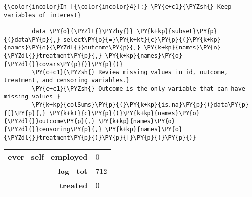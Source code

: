    \begin{Verbatim}[commandchars=\\\{\}]
{\color{incolor}In [{\color{incolor}4}]:} \PY{c+c1}{\PYZsh{} Keep variables of interest}
        
        data \PY{o}{\PYZlt{}\PYZhy{}} \PY{k+kp}{subset}\PY{p}{(}data\PY{p}{,} select\PY{o}{=}\PY{k+kt}{c}\PY{p}{(}\PY{k+kp}{names}\PY{o}{\PYZdl{}}outcome\PY{p}{,} \PY{k+kp}{names}\PY{o}{\PYZdl{}}treatment\PY{p}{,} \PY{k+kp}{names}\PY{o}{\PYZdl{}}covars\PY{p}{)}\PY{p}{)}
        \PY{c+c1}{\PYZsh{} Review missing values in id, outcome, treatment, and censoring variables.}
        \PY{c+c1}{\PYZsh{} Outcome is the only variable that can have missing values.}
        \PY{k+kp}{colSums}\PY{p}{(}\PY{k+kp}{is.na}\PY{p}{(}data\PY{p}{[}\PY{p}{,} \PY{k+kt}{c}\PY{p}{(}\PY{k+kp}{names}\PY{o}{\PYZdl{}}outcome\PY{p}{,} \PY{k+kp}{names}\PY{o}{\PYZdl{}}censoring\PY{p}{,} \PY{k+kp}{names}\PY{o}{\PYZdl{}}treatment\PY{p}{)}\PY{p}{]}\PY{p}{)}\PY{p}{)}
\end{Verbatim}


    \begin{longtable}{rl}
\textbf{ever\_self\_employed} & 0 \\
\textbf{log\_tot} &  712 \\
\textbf{treated} & 0
\end{longtable}


 
